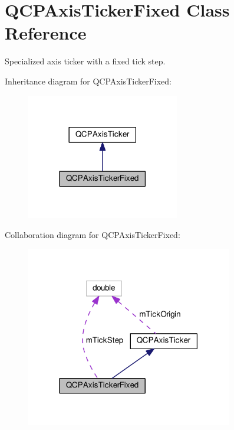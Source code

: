 \hypertarget{classQCPAxisTickerFixed}{}\section{Q\+C\+P\+Axis\+Ticker\+Fixed Class Reference}
\label{classQCPAxisTickerFixed}


Specialized axis ticker with a fixed tick step.  




Inheritance diagram for Q\+C\+P\+Axis\+Ticker\+Fixed\+:
\nopagebreak
\begin{figure}[H]
\begin{center}
\leavevmode
\includegraphics[width=189pt]{classQCPAxisTickerFixed__inherit__graph}
\end{center}
\end{figure}


Collaboration diagram for Q\+C\+P\+Axis\+Ticker\+Fixed\+:
\nopagebreak
\begin{figure}[H]
\begin{center}
\leavevmode
\includegraphics[width=255pt]{classQCPAxisTickerFixed__coll__graph}
\end{center}
\end{figure}
